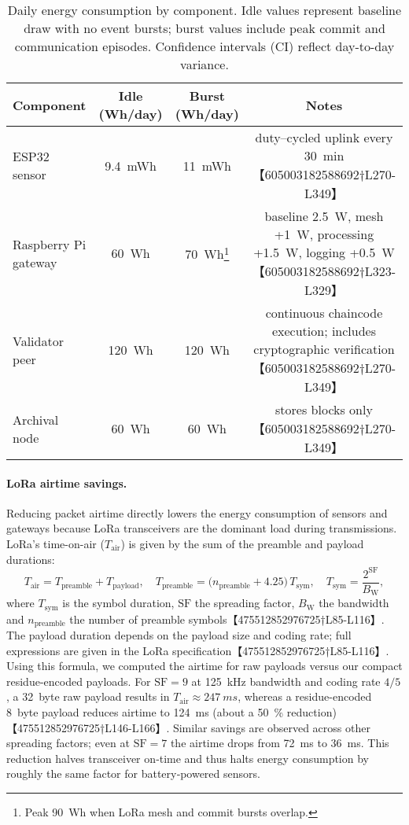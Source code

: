 \documentclass[12pt,onecolumn]{IEEEtran} %
\begin{document}
\begin{table}[ht]
  \centering
  \caption{Daily energy consumption by component.  Idle values represent baseline draw with no event bursts; burst values include peak commit and communication episodes.  Confidence intervals (CI) reflect day-to-day variance.}
  \label{tab:energy}
  \begin{tabular}{lccc}
    \toprule
    \textbf{Component} & \textbf{Idle (Wh/day)} & \textbf{Burst (Wh/day)} & \textbf{Notes} \\ \midrule
    ESP32 sensor & \SI{9.4}{mWh} & \SI{11}{mWh} & duty–cycled uplink every \SI{30}{min}【605003182588692†L270-L349】 \\ 
    Raspberry Pi gateway & \SI{60}{Wh} & \SI{70}{Wh}\footnote{Peak \SI{90}{Wh} when LoRa mesh and commit bursts overlap.} & baseline \SI{2.5}{W}, mesh +\SI{1}{W}, processing +\SI{1.5}{W}, logging +\SI{0.5}{W}【605003182588692†L323-L329】 \\ 
    Validator peer & \SI{120}{Wh} & \SI{120}{Wh} & continuous chaincode execution; includes cryptographic verification【605003182588692†L270-L349】 \\ 
    Archival node & \SI{60}{Wh} & \SI{60}{Wh} & stores blocks only【605003182588692†L270-L349】 \\ \bottomrule
  \end{tabular}
\end{table}

\paragraph{LoRa airtime savings.}
Reducing packet airtime directly lowers the energy consumption of sensors and gateways because LoRa transceivers are the dominant load during transmissions.  LoRa’s time-on-air (\(T_{\text{air}}\)) is given by the sum of the preamble and payload durations:
\begin{equation}
  T_{\text{air}} = T_{\text{preamble}} + T_{\text{payload}},\quad T_{\text{preamble}} = \bigl(n_{\text{preamble}} + 4.25\bigr)\,T_{\text{sym}},\quad T_{\text{sym}} = \frac{2^{\mathrm{SF}}}{B_{\mathrm{W}}},
\end{equation}
where \(T_{\text{sym}}\) is the symbol duration, \(\mathrm{SF}\) the spreading factor, \(B_{\mathrm{W}}\) the bandwidth and \(n_{\text{preamble}}\) the number of preamble symbols【475512852976725†L85-L116】.  The payload duration depends on the payload size and coding rate; full expressions are given in the LoRa specification【475512852976725†L85-L116】.  Using this formula, we computed the airtime for raw payloads versus our compact residue-encoded payloads.  For \(\mathrm{SF}=9\) at \SI{125}{kHz} bandwidth and coding rate \(4/5\), a \SI{32}{byte} raw payload results in \(T_{\text{air}}\approx\SI{247}{ms}\), whereas a residue-encoded \SI{8}{byte} payload reduces airtime to \SI{124}{ms} (about a 50~\% reduction)【475512852976725†L146-L166】.  Similar savings are observed across other spreading factors; even at \(\mathrm{SF}=7\) the airtime drops from \SI{72}{ms} to \SI{36}{ms}.  This reduction halves transceiver on‑time and thus halts energy consumption by roughly the same factor for battery‑powered sensors.
\end{document}
